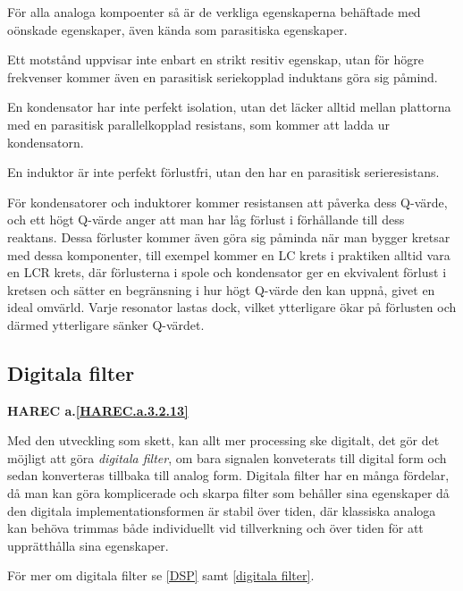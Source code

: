För alla analoga kompoenter så är de verkliga egenskaperna behäftade med
oönskade egenskaper, även kända som parasitiska egenskaper.

Ett motstånd uppvisar inte enbart en strikt resitiv egenskap, utan för högre
frekvenser kommer även en parasitisk seriekopplad induktans göra sig påmind.

En kondensator har inte perfekt isolation, utan det läcker alltid mellan
plattorna med en parasitisk parallelkopplad resistans, som kommer att ladda ur
kondensatorn.

En induktor är inte perfekt förlustfri, utan den har en parasitisk
serieresistans.

För kondensatorer och induktorer kommer resistansen att påverka dess Q-värde,
och ett högt Q-värde anger att man har låg förlust i förhållande till dess
reaktans.
Dessa förluster kommer även göra sig påminda när man bygger kretsar med dessa
komponenter, till exempel kommer en LC krets i praktiken alltid vara en LCR krets, där
förlusterna i spole och kondensator ger en ekvivalent förlust i kretsen och
sätter en begränsning i hur högt Q-värde den kan uppnå, givet en ideal omvärld.
Varje resonator lastas dock, vilket ytterligare ökar på förlusten och därmed
ytterligare sänker Q-värdet.

\subsection{Digitala filter}
\textbf{HAREC a.\ref{HAREC.a.3.2.13}\label{myHAREC.a.3.2.13}}

Med den utveckling som skett, kan allt mer processing ske digitalt, det gör
det möjligt att göra \emph{digitala filter}, om bara signalen konveterats till
digital form och sedan konverteras tillbaka till analog form.
Digitala filter har en många fördelar, då man kan göra komplicerade och
skarpa filter som behåller sina egenskaper då den digitala implementationsformen
är stabil över tiden, där klassiska analoga kan behöva trimmas både
individuellt vid tillverkning och över tiden för att upprätthålla sina
egenskaper.

För mer om digitala filter se \ref{DSP} samt \ref{digitala filter}.
